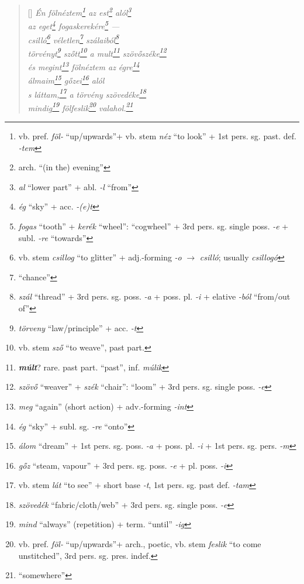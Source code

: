 \documentclass[a4paper,12pt,twoside,final]{book}
\begin{document}
\begin{verse}[\versewidth]
  \it
  Én fölnéztem\footnote{vb. pref. \emph{föl-} ``up/upwards''+ vb. stem
  \emph{néz} ``to look'' + 1st pers. sg. past. def. \emph{-tem}} az
  est\footnote{arch. ``(in the) evening''} alól\footnote{\emph{al}
  ``lower part'' + abl. \emph{-l} ``from''} \\
  az eget\footnote{\emph{ég} ``sky'' + acc. \emph{-(e)t}}
  fogaskerekére\footnote{\emph{fogas} ``tooth'' +
  \emph{kerék} ``wheel'': ``cogwheel'' + 3rd pers. sg. single
  poss. \emph{-e} + subl. \emph{-re} ``towards''} --- \\
  csilló\footnote{vb. stem \emph{csillog} ``to glitter'' +
  adj.-forming \emph{-o} $\rightarrow$
  \emph{csilló}; usually \emph{csillogó}}
  véletlen\footnote{``chance''} szálaiból\footnote{\emph{szál}
  ``thread'' + 3rd pers. sg. poss. \emph{-a} + poss. pl. \emph{-i} +
  elative \emph{-ból} ``from/out of''} \\
  törvényt\footnote{\emph{törveny} ``law/principle'' + acc. \emph{-t}}
  szőtt\footnote{vb. stem \emph{sző} ``to weave'', past part.} a
  mult\footnote{\textbf{\emph{múlt}}? rare. past part. ``past'',
  inf. \emph{múlik}}
  szövőszéke\footnote{\emph{szövő} ``weaver'' + \emph{szék} ``chair'':
  ``loom'' + 3rd pers. sg. single poss. \emph{-e}} \\
  és megint\footnote{\emph{meg} ``again'' (short action) +
  adv.-forming \emph{-int}} fölnéztem az égre\footnote{\emph{ég}
  ``sky'' + subl. sg. \emph{-re} ``onto''} \\
  álmaim\footnote{\emph{álom} ``dream'' +
  1st pers. sg. poss. \emph{-a} + poss. pl. \emph{-i} + 1st
  pers. sg. pers. \emph{-m}} gőzei\footnote{\emph{gőz} ``steam,
  vapour'' + 3rd pers. sg. poss. \emph{-e} + pl. poss. \emph{-i}} alól \\
  s láttam,\footnote{vb. stem \emph{lát} ``to see'' +
  short base \emph{-t}, 1st pers. sg. past def. \emph{-tam}} a törvény
  szövedéke\footnote{\emph{szövedék} ``fabric/cloth/web'' + 3rd
  pers. sg. single poss. \emph{-e}} \\
  mindig\footnote{\emph{mind} ``always'' (repetition) + term. ``until''
  \emph{-ig}} fölfeslik\footnote{vb. pref. \emph{föl-} ``up/upwards''+
  arch., poetic, vb. stem
  \emph{feslik} ``to come unstitched'', 3rd pers. sg. pres. indef.}
  valahol.\footnote{``somewhere''}
\end{verse}

\newpage

\end{document}
